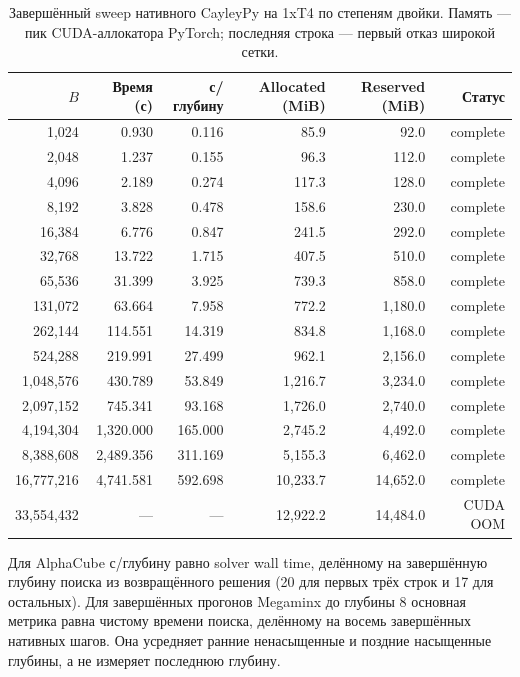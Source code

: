 \documentclass[10pt,twocolumn]{article}
\begin{document}
\begin{table}[t]
\centering
\small
\setlength{\tabcolsep}{4pt}
\caption{Завершённый sweep нативного CayleyPy на 1xT4 по степеням двойки.
Память --- пик CUDA-аллокатора PyTorch; последняя строка --- первый отказ
широкой сетки.}
\label{tab:cayleypy_curve}
\begin{tabular}{@{}rrrrrr@{}}
\toprule
$B$ & Время (с) & с/глубину & Allocated (MiB) & Reserved (MiB) & Статус \\
\midrule
1,024 & 0.930 & 0.116 & 85.9 & 92.0 & complete \\
2,048 & 1.237 & 0.155 & 96.3 & 112.0 & complete \\
4,096 & 2.189 & 0.274 & 117.3 & 128.0 & complete \\
8,192 & 3.828 & 0.478 & 158.6 & 230.0 & complete \\
16,384 & 6.776 & 0.847 & 241.5 & 292.0 & complete \\
32,768 & 13.722 & 1.715 & 407.5 & 510.0 & complete \\
65,536 & 31.399 & 3.925 & 739.3 & 858.0 & complete \\
131,072 & 63.664 & 7.958 & 772.2 & 1,180.0 & complete \\
262,144 & 114.551 & 14.319 & 834.8 & 1,168.0 & complete \\
524,288 & 219.991 & 27.499 & 962.1 & 2,156.0 & complete \\
1,048,576 & 430.789 & 53.849 & 1,216.7 & 3,234.0 & complete \\
2,097,152 & 745.341 & 93.168 & 1,726.0 & 2,740.0 & complete \\
4,194,304 & 1,320.000 & 165.000 & 2,745.2 & 4,492.0 & complete \\
8,388,608 & 2,489.356 & 311.169 & 5,155.3 & 6,462.0 & complete \\
16,777,216 & 4,741.581 & 592.698 & 10,233.7 & 14,652.0 & complete \\
33,554,432 & --- & --- & 12,922.2 & 14,484.0 & CUDA OOM \\
\bottomrule
\end{tabular}
\end{table}

Для AlphaCube с/глубину равно solver wall time, делённому на завершённую
глубину поиска из возвращённого решения (20 для первых трёх строк и 17 для
остальных). Для завершённых прогонов Megaminx до глубины 8 основная метрика
равна чистому времени поиска, делённому на восемь завершённых нативных шагов.
Она усредняет ранние ненасыщенные и поздние насыщенные глубины, а не измеряет
последнюю глубину.
\end{document}
